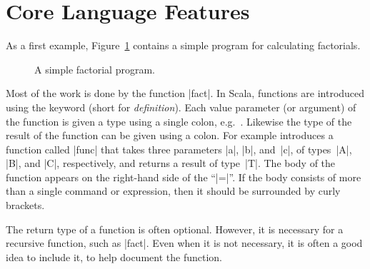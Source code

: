 \section{Core Language Features}
\label{sec:scala-core}

As a first example, Figure~\ref{fig:factorial} contains a simple program for
calculating factorials.
%
\begin{figure}
\caption{A simple factorial program.}
\label{fig:factorial}
\end{figure}





Most of the work is done by the function |fact|.  In Scala, functions are
introduced using the keyword  (short for
\emph{definition}).  Each value parameter (or argument)
of the function is given a type using a single colon, e.g.~.
Likewise the type of the result of the function can be given using a colon.
For example
introduces a function called |func| that takes three parameters |a|, |b|,
and~|c|, of types~|A|, |B|, and |C|, respectively, and returns a result of
type~|T|.  The body of the function appears on the right-hand side of the
``|=|''.  If the body consists of more than a single command or expression,
then it should be surrounded by curly brackets.

The return type of a function is often optional.  However, it is necessary for
a recursive function, such as |fact|.  Even when it is not necessary, it is
often a good idea to include it, to help document the function.

